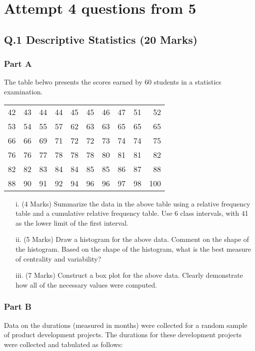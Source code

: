 \documentclass[a4paper,12pt]{article}
\begin{document}
\section*{Attempt 4 questions from 5}


\subsection*{Q.1 Descriptive Statistics (20 Marks)}
\subsubsection*{Part A} %
The table belwo presents the scores earned by 60 students in a statistics examination.
\begin{table}[ht]
\begin{center}
\begin{tabular}{|rrrrrrrrrr|}
\hline
42	&	43	&	44	&	44	&	45	&	45	&	46	&	47	&	51	&	52	\\
53	&	54	&	55	&	57	&	62	&	63	&	63	&	65	&	65	&	65	\\
66	&	66	&	69	&	71	&	72	&	72	&	73	&	74	&	74	&	75	\\
76	&	76	&	77	&	78	&	78	&	78	&	80	&	81	&	81	&	82	\\
82	&	82	&	83	&	84	&	84	&	85	&	85	&	86	&	87	&	88	\\
88	&	90	&	91	&	92	&	94	&	96	&	96	&	97	&	98	&	100	\\
\hline
\end{tabular}
\end{center}
\end{table}
\vspace{-0.5cm}
\begin{itemize}
\item[i.] (4 Marks) Summarize the data in the above table using a relative frequency table and a cumulative relative frequency table. Use 6 class intervals, with 41 as the lower limit of the first interval.
\item[ii.] (5 Marks) Draw a histogram for the above data. Comment on the shape of the histogram. Based on the shape of the histogram, what is the best measure of centrality and variability?
\item[iii.] (7 Marks) Construct a box plot for the above data. Clearly demonstrate how all of the necessary values were computed.
\end{itemize}

\vspace{0.25cm}
\subsubsection*{Part B} %
Data on the durations (measured in months) were collected for a random sample of product development projects.
The durations for these development projects were collected and tabulated as follows:
\end{document}
